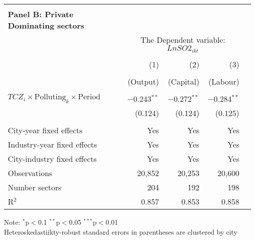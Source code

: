 \documentclass[12pt]{article}
\begin{document}
\begin{table}[!htb]
\begin{adjustbox}{width=\textwidth, totalheight=\baselineskip,keepaspectratio}
\begin{tabular}{lrrrr}
        \bottomrule
        \\ %
        \multicolumn{1}{l}{\textbf{Panel B: Private Dominating sectors}} \\
        \toprule
        & \multicolumn{3}{c}{The Dependent variable: $Ln SO2_{ikt}$} \\
        \cline{2-4}
        \\[-1.8ex] & (1) & (2) & (3)\\
        \\[-1.8ex] &  (Output)& (Capital) & (Labour) \\
        \hline \\[-1.8ex]
        $TCZ_i \times \text{Polluting}_k \times \text{Period}$ & $-$0.243$^{**}$ & $-$0.272$^{**}$ & $-$0.284$^{**}$ \\
                                                            & (0.124)         & (0.124)         & (0.125)         \\
        \hline \\[-1.8ex]
        City-year fixed effects                             & Yes             & Yes             & Yes             \\
        Industry-year fixed effects                         & Yes             & Yes             & Yes             \\
        City-industry fixed effects                         & Yes             & Yes             & Yes             \\
        Observations                                        & 20,852          & 20,253          & 20,600          \\
        Number sectors                                      & 204             & 192             & 198             \\
        R$^{2}$                                             & 0.857           & 0.853           & 0.858           \\
    \end{tabular}
    \end{adjustbox}
    \begin{tablenotes}
      \small
      \item 
      Note: $^{*}$p$<$0.1 $^{**}$p$<$0.05 $^{***}$p$<$0.01 \\
      Heteroskedastiikty-robust standard errors in parentheses are clustered by city \\
    \end{tablenotes}
\end{table}
\end{document}
